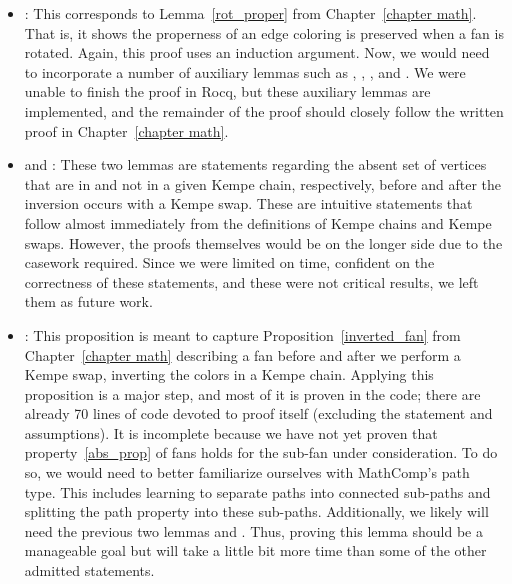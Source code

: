 \begin{itemize}
    \item \textit{}: This corresponds to Lemma~\ref{rot_proper} from Chapter~\ref{chapter math}. That is, it shows the properness of an edge coloring is preserved when a fan is rotated. Again, this proof uses an induction argument. Now, we would need to incorporate a number of auxiliary lemmas such as , , , and . We were unable to finish the proof in Rocq, but these auxiliary lemmas are implemented, and the remainder of the proof should closely follow the written proof in Chapter~\ref{chapter math}. 
    \item \textit{} and \textit{}: These two lemmas are statements regarding the absent set of vertices that are in and not in a given Kempe chain, respectively, before and after the inversion occurs with a Kempe swap. These are intuitive statements that follow almost immediately from the definitions of Kempe chains and Kempe swaps. However, the proofs themselves would be on the longer side due to the casework required. Since we were limited on time, confident on the correctness of these statements, and these were not critical results, we left them as future work.
    \item \textit{}: This proposition is meant to capture Proposition~\ref{inverted_fan} from Chapter~\ref{chapter math} describing a fan before and after we perform a Kempe swap, inverting the colors in a Kempe chain. Applying this proposition is a major step, and most of it is proven in the code; there are already 70 lines of code devoted to proof itself (excluding the statement and assumptions). It is incomplete because we have not yet proven that property~\ref{abs_prop} of fans holds for the sub-fan under consideration. To do so, we would need to better familiarize ourselves with MathComp's path type. This includes learning to separate paths into connected sub-paths and splitting the path property into these sub-paths. Additionally, we likely will need the previous two lemmas  and . Thus, proving this lemma should be a manageable goal but will take a little bit more time than some of the other admitted statements.
\end{itemize}